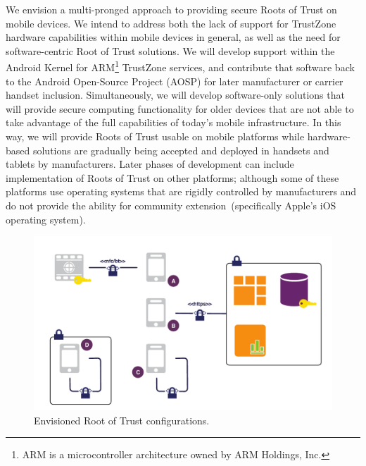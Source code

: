 \documentclass[10pt,letterpaper]{article}
\begin{document}
We envision a multi-pronged approach to providing secure Roots of Trust on mobile devices. We intend to address both the lack of support for TrustZone hardware capabilities within mobile devices in general, as well as the need for software-centric Root of Trust solutions. We will develop support within the Android Kernel for ARM\footnote{ARM is a microcontroller architecture owned by ARM Holdings, Inc.} TrustZone services, and contribute that software back to the Android Open-Source Project (AOSP) for later manufacturer or carrier handset inclusion. Simultaneously, we will develop software-only solutions that will provide secure computing functionality for older devices that are not able to take advantage of the full capabilities of today's mobile infrastructure. In this way, we will provide Roots of Trust usable on mobile platforms while hardware-based solutions are gradually being accepted and deployed in handsets and tablets by manufacturers.  Later phases of development can include implementation of Roots of Trust on other platforms; although some of these platforms use operating systems that are rigidly controlled by manufacturers and do not provide the ability for community extension~(specifically Apple's iOS operating system).

\begin{figure}
\vspace{-0.2in}
\centerline{\includegraphics[width=\textwidth]{./images/conops.pdf}}
\vspace{-0.1in}
\caption{Envisioned Root of Trust configurations.}
\label{fig:conops}
\end{figure}
\end{document}

